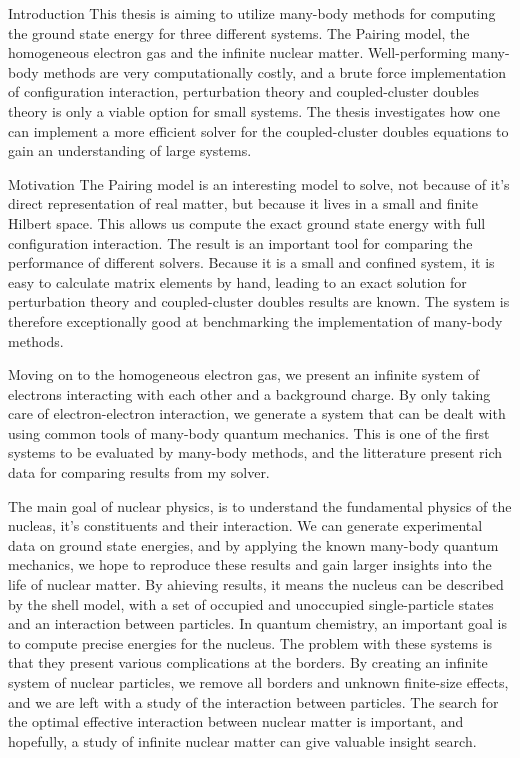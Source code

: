 \documentclass[twoside,english]{uiofysmaster}
\begin{document}
\tableofcontents


\begin{chapter}{Introduction}
	This thesis is aiming to utilize many-body methods for computing the ground state energy for three different systems. The Pairing model, the homogeneous electron gas and the infinite nuclear matter. Well-performing many-body methods are very computationally costly, and a brute force implementation of configuration interaction, perturbation theory and coupled-cluster doubles theory is only a viable option for small systems. The thesis investigates how one can implement a more efficient solver for the coupled-cluster doubles equations to gain an understanding of large systems. 

	\begin{subsection}{Motivation}
		The Pairing model is an interesting model to solve, not because of it's direct representation of real matter, but because it lives in a small and finite Hilbert space. This allows us compute the exact ground state energy with full configuration interaction. The result is an important tool for comparing the performance of different solvers. Because it is a small and confined system, it is easy to calculate matrix elements by hand, leading to an exact solution for perturbation theory and coupled-cluster doubles results are known. The system is therefore exceptionally good at benchmarking the implementation of many-body methods. 

		Moving on to the homogeneous electron gas, we present an infinite system of electrons interacting with each other and a background charge. By only taking care of electron-electron interaction, we generate a system that can be dealt with using common tools of many-body quantum mechanics. This is one of the first systems to be evaluated by many-body methods, and the litterature present rich data for comparing results from my solver. 

		The main goal of nuclear physics, is to understand the fundamental physics of the nucleas, it's constituents and their interaction. We can generate experimental data on ground state energies, and by applying the known many-body quantum mechanics, we hope to reproduce these results and gain larger insights into the life of nuclear matter. By ahieving  results, it means the nucleus can be described by the shell model, with a set of occupied and unoccupied single-particle states and an interaction between particles. In quantum chemistry, an important goal is to compute precise energies for the nucleus. The problem with these systems is that they present various complications at the borders. By creating an infinite system of nuclear particles, we remove all borders and unknown finite-size effects, and we are left with a study of the interaction between particles. The search for the optimal effective interaction between nuclear matter is important, and hopefully, a study of infinite nuclear matter can give valuable insight search. 
	\end{subsection}


\end{chapter}
\end{document}

